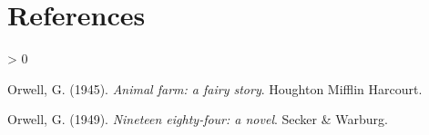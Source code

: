 \documentclass[
  notoc %
]{tufte-book}
\newlength{\cslhangindent}
\newenvironment{CSLReferences}[2] %
 {%
  \setlength{\parindent}{0pt}
  \ifodd #1 \everypar{\setlength{\hangindent}{\cslhangindent}}\ignorespaces\fi
  \ifnum #2 > 0
  \setlength{\parskip}{#2\baselineskip}
  \fi
 }%
 {}
\begin{document}
\hypertarget{references}{%
\chapter*{References}\label{references}}

\hypertarget{refs}{}
\begin{CSLReferences}{1}{0}
\leavevmode\hypertarget{ref-orwell1945animal}{}%
Orwell, G. (1945). \emph{{Animal farm: a fairy story}}. Houghton Mifflin
Harcourt.

\leavevmode\hypertarget{ref-orwell1949nineteen}{}%
Orwell, G. (1949). \emph{{Nineteen eighty-four: a novel}}. Secker \&
Warburg.

\end{CSLReferences}

\backmatter
\end{document}
